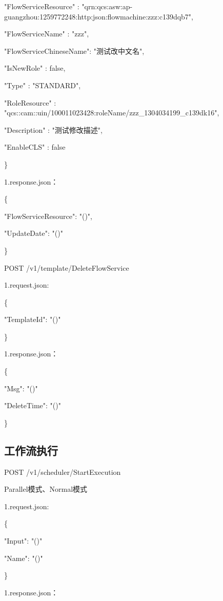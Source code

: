     "FlowServiceResource"   : "qrn:qcs:asw:ap-guangzhou:1259772248:http:json:flowmachine:zzz:c139dqb7",


    "FlowServiceName"       :  "zzz",

    "FlowServiceChineseName":  "测试改中文名",

    "IsNewRole"             :  false,

    "Type"                  :  "STANDARD",

    "RoleResource"          :  "qcs::cam::uin/100011023428:roleName/zzz\_1304034199\_c139dk16",

    "Description"           :  "测试修改描述",

    "EnableCLS"             :  false

\}

1.response.json：

\{

"FlowServiceResource": "\@notEmpty()",

"UpdateDate": "\@notEmpty()"

\}

POST /v1/template/DeleteFlowService

1.request.json:

\{

    "TemplateId": "\@exists()"

\}


1.response.json：

\{

    "Msg": "\@exists()"

    "DeleteTime": "\@exists()"

\}


\subsection{工作流执行}
POST /v1/scheduler/StartExecution

Parallel模式、Normal模式

1.request.json:

\{

"Input": "\@exists()"

"Name": "\@notEmpty()"

\}


1.response.json：


